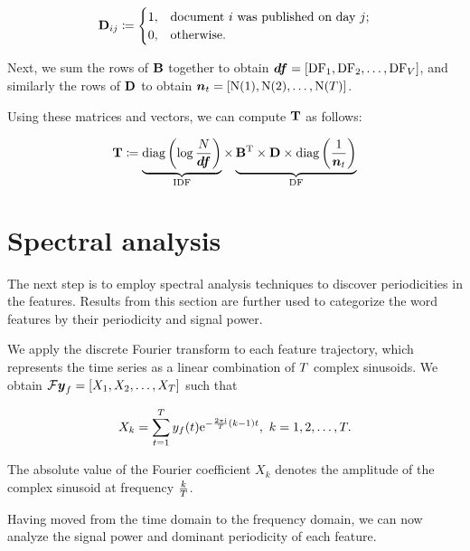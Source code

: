 \begin{equation}
	\mathbf{D}_{ij} \coloneqq
	\begin{cases}
		1, & \text{document}~i~\text{was published on day}~j \text{;} \\
		0, & \text{otherwise}.
	\end{cases}
\end{equation}

Next, we sum the rows of $\mathbf{B}$ together to obtain $\vect{\df} = \left[ \text{\df}_{1}, \text{\df}_{2}, \dots, \text{\df}_{\featcount} \right]$, and similarly the rows of $\mathbf{D}$ to obtain $\vect{\doccount}_{t} = \left[ \text{\doccount}(1), \text{\doccount}(2), \dots, \text{\doccount}(\streamlen) \right]$.

Using these matrices and vectors, we can compute $\mathbf{T}$ as follows:

\begin{equation}
	\trajmat \coloneqq
		\underbrace{\text{diag} \left( \log{\frac{\doccount}{\vect{\df}}} \right)}_{\text{IDF}}
		\times
		\underbrace{\bowmat^{\T}
		\times \dtdmat
		\times \text{diag} \left( \frac{1}{\vect{\doccount}_{t}} \right)}_{\text{DF}}
\end{equation}


\section{Spectral analysis}
The next step is to employ spectral analysis techniques to discover periodicities in the features. Results from this section are further used to categorize the word features by their periodicity and signal power.

We apply the discrete Fourier transform to each feature trajectory, which represents the time series as a linear combination of $T$ complex sinusoids. We obtain $\mathcal{F} \vect{\traj}_{f} = \left[ X_{1}, X_{2}, \dots, X_{\streamlen}\right ]$ such that

\begin{equation*}
	X_{k} = \sum_{t = 1}^{T}{y_{f}(t) \mathrm{e}^{- \frac{2 \pi \mathrm{i}}{T} (k - 1) t}}, ~ k = 1, 2, \dots, T.
\end{equation*}

The absolute value of the Fourier coefficient $X_{k}$ denotes the amplitude of the complex sinusoid at frequency $\frac{k}{T}$.

Having moved from the time domain to the frequency domain, we can now analyze the signal power and dominant periodicity of each feature.

